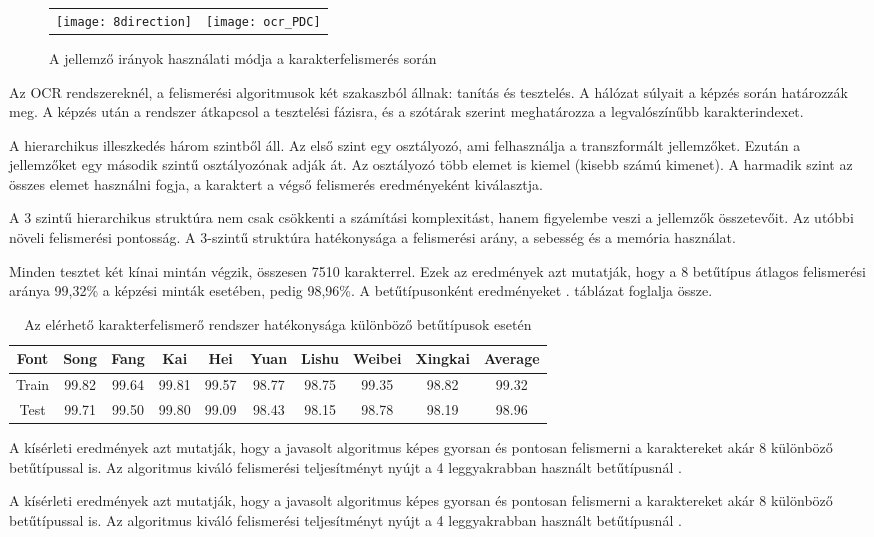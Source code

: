 \begin{figure}[h]
\centering
\begin{tabular}{ c c }
\texttt{[image: 8direction]} & \texttt{[image: ocr\_PDC]}
\end{tabular}
\caption{A jellemző irányok használati módja a karakterfelismerés során}
\label{fig:8direction}
\end{figure}

Az OCR rendszereknél, a felismerési algoritmusok két szakaszból állnak: tanítás és tesztelés. A hálózat súlyait a képzés során határozzák meg. A képzés után a rendszer átkapcsol a tesztelési fázisra, és a szótárak szerint meghatározza a legvalószínűbb karakterindexet.

A hierarchikus illeszkedés három szintből áll. Az első szint egy osztályozó, ami felhasználja a transzformált jellemzőket. Ezután a jellemzőket egy második szintű osztályozónak adják át. Az osztályozó több elemet is kiemel (kisebb számú kimenet). A harmadik szint az összes elemet használni fogja, a karaktert a végső felismerés eredményeként kiválasztja.

A 3 szintű hierarchikus struktúra nem csak csökkenti a számítási komplexitást, hanem figyelembe veszi a jellemzők összetevőit. Az utóbbi növeli felismerési pontosság. A 3-szintű struktúra hatékonysága a felismerési arány, a sebesség és a memória használat.

Minden tesztet két kínai mintán végzik, összesen 7510 karakterrel. Ezek az eredmények azt mutatják, hogy a 8 betűtípus átlagos felismerési aránya 99,32\% a képzési minták esetében, pedig 98,96\%. A betűtípusonként eredményeket . táblázat foglalja össze.

\begin{table}
\centering
\begin{tabular}{ |c|c|c|c|c|c|c|c|c|c|}
\hline
Font & Song & Fang & Kai & Hei & Yuan & Lishu & Weibei & Xingkai & Average\\
\hline
Train & 99.82 & 99.64 & 99.81 & 99.57 & 98.77 & 98.75 & 99.35 & 98.82 & 99.32\\
\hline
Test & 99.71 & 99.50 & 99.80 & 99.09 & 98.43 & 98.15 & 98.78 & 98.19 & 98.96\\
\hline
\end{tabular}
\caption{Az elérhető karakterfelismerő rendszer hatékonysága különböző betűtípusok esetén}
\label{tab:ccr_results}
{\cite{wu2002recognition}}
\end{table}

A kísérleti eredmények azt mutatják, hogy a javasolt algoritmus képes gyorsan és pontosan felismerni a karaktereket akár 8 különböző betűtípussal is. Az algoritmus kiváló felismerési teljesítményt nyújt a 4 leggyakrabban használt betűtípusnál \cite{ccr}.

A kísérleti eredmények azt mutatják, hogy a javasolt algoritmus képes gyorsan és pontosan felismerni a karaktereket akár 8 különböző betűtípussal is. Az algoritmus kiváló felismerési teljesítményt nyújt a 4 leggyakrabban használt betűtípusnál \cite{wu2002recognition}.

